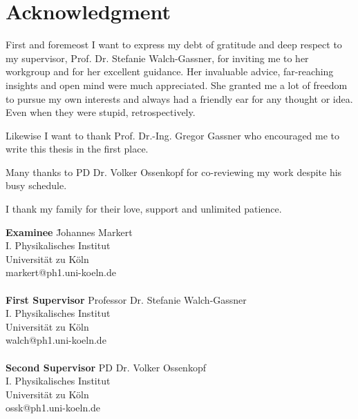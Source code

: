\section*{Acknowledgment}

First and foremeost I want to express my debt of gratitude and deep respect to
my supervisor, Prof. Dr. Stefanie Walch-Gassner, for inviting me to her
workgroup and for her excellent guidance.  Her invaluable advice, far-reaching
insights and open mind were much appreciated.  She granted me a lot of freedom
to pursue my own interests and always had a friendly ear for any thought or
idea. Even when they were stupid, retrospectively.

Likewise I want to thank Prof. Dr.-Ing. Gregor Gassner who encouraged me to
write this thesis in the first place.

Many thanks to PD Dr. Volker Ossenkopf for co-reviewing my work despite his
busy schedule.

\vspace{0.5cm}

I thank my family for their love, support and unlimited patience.

\vspace{3cm}


\begin{tabbing}
\hspace{1cm}    \= \textbf{Examinee} \hspace{4cm}  \= Johannes Markert \\
                \>                                 \> I. Physikalisches Institut \\
                \>                                 \> Universität zu Köln \\
                \>                                 \> markert@ph1.uni-koeln.de  \\\\

                \> \textbf{First Supervisor}       \> Professor Dr. Stefanie Walch-Gassner \\
                \>                                 \> I. Physikalisches Institut \\
                \>                                 \> Universität zu Köln \\
                \>                                 \> walch@ph1.uni-koeln.de  \\\\

                \> \textbf{Second Supervisor}      \> PD Dr. Volker Ossenkopf \\
                \>                                 \> I. Physikalisches Institut \\
                \>                                 \> Universität zu Köln \\
                \>                                 \> ossk@ph1.uni-koeln.de
\end{tabbing}

